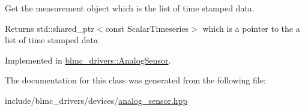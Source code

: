 Get the measurement object which is the list of time stamped data. 

\begin{DoxyReturn}{Returns}
std\+::shared\+\_\+ptr$<$const Scalar\+Timeseries$>$ which is a pointer to the a list of time stamped data 
\end{DoxyReturn}


Implemented in \hyperlink{classblmc__drivers_1_1AnalogSensor_af90fc9f142c7855b50f8d295b50d18e6}{blmc\+\_\+drivers\+::\+Analog\+Sensor}.



The documentation for this class was generated from the following file\+:\begin{DoxyCompactItemize}
\item 
include/blmc\+\_\+drivers/devices/\hyperlink{analog__sensor_8hpp}{analog\+\_\+sensor.\+hpp}\end{DoxyCompactItemize}

